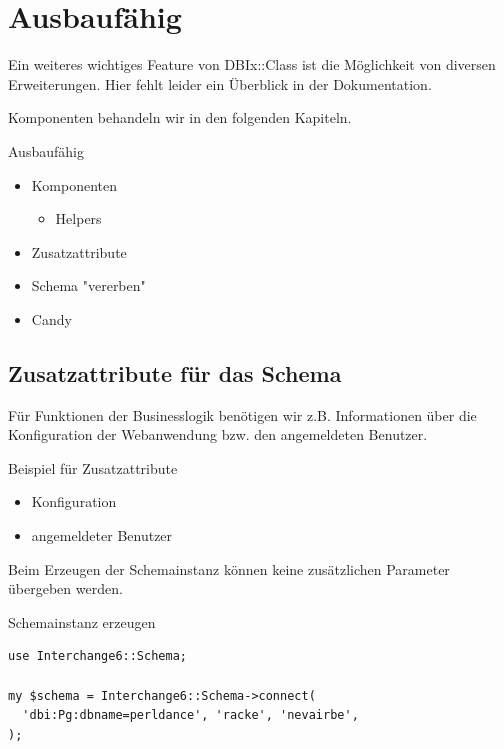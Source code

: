 
\section{Ausbaufähig}

Ein weiteres wichtiges Feature von DBIx::Class ist die Möglichkeit von
diversen Erweiterungen. Hier fehlt leider ein Überblick in der
Dokumentation.

Komponenten behandeln wir in den folgenden Kapiteln.

\begin{frame}{Ausbaufähig}
\begin{itemize}
\item Komponenten
  \begin{itemize}
  \item Helpers
  \end{itemize}
\item Zusatzattribute
\item Schema "vererben"
\item Candy
\end{itemize}
\end{frame}

\subsection{Zusatzattribute für das Schema}

Für Funktionen der Businesslogik benötigen wir z.B.
Informationen über die Konfiguration der Webanwendung
bzw. den angemeldeten Benutzer.

\begin{frame}{Beispiel für Zusatzattribute}
\begin{itemize}
\item Konfiguration
\item angemeldeter Benutzer
\end{itemize}
\end{frame}

Beim Erzeugen der Schemainstanz können keine zusätzlichen Parameter
übergeben werden.

\begin{frame}[fragile]{Schemainstanz erzeugen}
\begin{lstlisting}
use Interchange6::Schema;

my $schema = Interchange6::Schema->connect(
  'dbi:Pg:dbname=perldance', 'racke', 'nevairbe', 
);
\end{lstlisting}
\end{frame}

